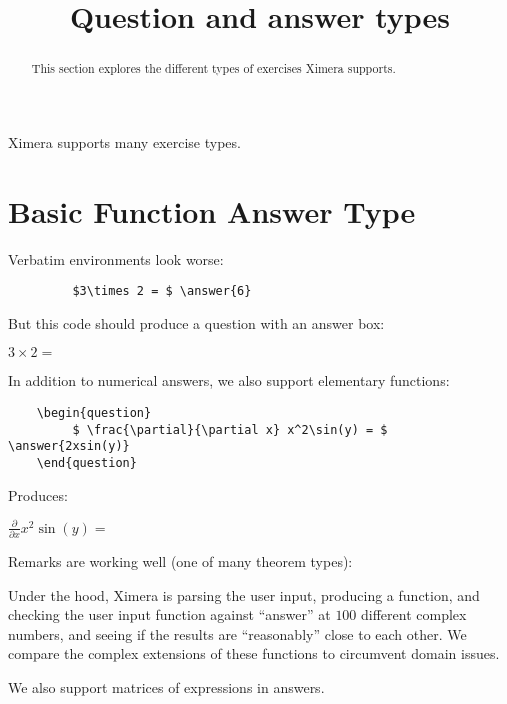 \documentclass{ximera}
\title{Question and answer types}
\begin{document}
\begin{abstract}
  This section explores the different types of exercises Ximera supports. 
\end{abstract}

\maketitle

Ximera supports many exercise types.


\section{Basic Function Answer Type}

Verbatim environments look worse:

\begin{verbatim}
         $3\times 2 = $ \answer{6}
\end{verbatim}

But this code should produce a question with an answer box:

\begin{question}
  $3\times 2 = $ 
\end{question}


In addition to numerical answers, we also support elementary functions:

\begin{verbatim}
    \begin{question}
         $ \frac{\partial}{\partial x} x^2\sin(y) = $ \answer{2xsin(y)}
    \end{question}
\end{verbatim}

Produces:

\begin{question}
  $ \frac{\partial}{\partial x} x^2\sin(y) = $ 
\end{question}

Remarks are working well (one of many theorem types):

\begin{remark}
Under the hood, Ximera is parsing the user input, producing a
function, and checking the user input function against ``answer'' at
$100$ different complex numbers, and seeing if the results are
``reasonably'' close to each other.  We compare the complex extensions
of these functions to circumvent domain issues.
\end{remark}

We also support matrices of expressions in answers.
\end{document}
